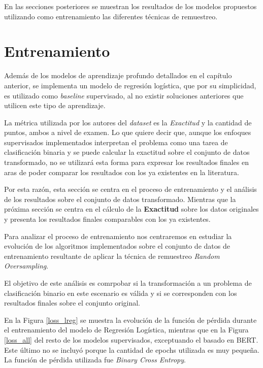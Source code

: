 En las secciones posteriores se muestran los resultados de los modelos propuestos utilizando como entrenamiento las diferentes técnicas de remuestreo.

\section{Entrenamiento}

Además de los modelos de aprendizaje profundo detallados en el capítulo anterior, se implementa un modelo de regresión logística, que por su simplicidad, es utilizado como \textit{baseline} supervisado, al no existir soluciones anteriores que utilicen este tipo de aprendizaje.

La métrica utilizada por los autores del \textit{dataset} es la \textit{Exactitud} y la cantidad de puntos, ambos a nivel de examen. Lo que quiere decir que, aunque los enfoques supervisados implementados interpretan el problema como una tarea de clasificación binaria y se puede calcular la exactitud sobre el conjunto de datos transformado, no se utilizará esta forma para expresar los resultados finales en aras de poder comparar los resultados con los ya existentes en la literatura.

Por esta razón, esta sección se centra en el proceso de entrenamiento y el análisis de los resultados sobre el conjunto de datos transformado. Mientras que la próxima sección se centra en el cálculo de la \textbf{Exactitud} sobre los datos originales y presenta los resultados finales comparables con los ya existentes.

Para analizar el proceso de entrenamiento nos centraremos en estudiar la evolución de los algoritmos implementados sobre el conjunto de datos de entrenamiento resultante de aplicar la técnica de remuestreo \textit{Random Oversampling}. 

El objetivo de este análisis es comrpobar si la transformación a un problema de clasificación binario en este escenario es válida y si se corresponden con los resultados finales sobre el conjunto original.

En la Figura \ref{loss_lreg} se muestra la evolución de la función de pérdida durante el entrenamiento del modelo de Regresión Logística, mientras que en la Figura \ref{loss_all} del resto de los modelos supervisados, exceptuando el basado en BERT. Este último no se incluyó porque la cantidad de epochs utilizada es muy pequeña. La función de pérdida utilizada fue \textit{Binary Cross Entropy}.

